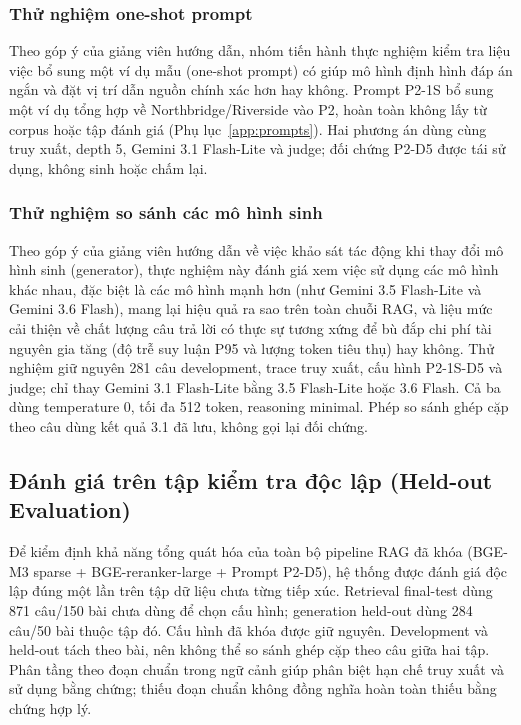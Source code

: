 \subsubsection{Thử nghiệm one-shot prompt}
Theo góp ý của giảng viên hướng dẫn, nhóm tiến hành thực nghiệm kiểm tra liệu việc bổ sung một ví dụ mẫu (one-shot prompt) có giúp mô hình định hình đáp án ngắn và đặt vị trí dẫn nguồn chính xác hơn hay không. Prompt P2-1S bổ sung một ví dụ tổng hợp về Northbridge/Riverside vào P2, hoàn toàn không lấy từ corpus hoặc tập đánh giá (Phụ lục~\ref{app:prompts}). Hai phương án dùng cùng truy xuất, depth 5, Gemini 3.1 Flash-Lite và judge; đối chứng P2-D5 được tái sử dụng, không sinh hoặc chấm lại.


\subsubsection{Thử nghiệm so sánh các mô hình sinh}
Theo góp ý của giảng viên hướng dẫn về việc khảo sát tác động khi thay đổi mô hình sinh (generator), thực nghiệm này đánh giá xem việc sử dụng các mô hình khác nhau, đặc biệt là các mô hình mạnh hơn (như Gemini 3.5 Flash-Lite và Gemini 3.6 Flash), mang lại hiệu quả ra sao trên toàn chuỗi RAG, và liệu mức cải thiện về chất lượng câu trả lời có thực sự tương xứng để bù đắp chi phí tài nguyên gia tăng (độ trễ suy luận P95 và lượng token tiêu thụ) hay không. Thử nghiệm giữ nguyên 281 câu development, trace truy xuất, cấu hình P2-1S-D5 và judge; chỉ thay Gemini 3.1 Flash-Lite bằng 3.5 Flash-Lite hoặc 3.6 Flash. Cả ba dùng temperature 0, tối đa 512 token, reasoning minimal. Phép so sánh ghép cặp theo câu dùng kết quả 3.1 đã lưu, không gọi lại đối chứng.


\subsection{Đánh giá trên tập kiểm tra độc lập (Held-out Evaluation)}\label{sec:heldout}
Để kiểm định khả năng tổng quát hóa của toàn bộ pipeline RAG đã khóa (BGE-M3 sparse + BGE-reranker-large + Prompt P2-D5), hệ thống được đánh giá độc lập đúng một lần trên tập dữ liệu chưa từng tiếp xúc. Retrieval final-test dùng 871 câu/150 bài chưa dùng để chọn cấu hình; generation held-out dùng 284 câu/50 bài thuộc tập đó. Cấu hình đã khóa được giữ nguyên. Development và held-out tách theo bài, nên không thể so sánh ghép cặp theo câu giữa hai tập. Phân tầng theo đoạn chuẩn trong ngữ cảnh giúp phân biệt hạn chế truy xuất và sử dụng bằng chứng; thiếu đoạn chuẩn không đồng nghĩa hoàn toàn thiếu bằng chứng hợp lý.


